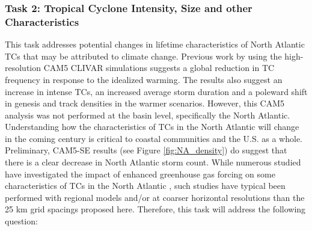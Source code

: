 \documentclass[11pt]{article}
\begin{document}





\subsubsection{Task 2: Tropical Cyclone Intensity, Size and other Characteristics}

This task addresses potential changes in lifetime characteristics of North Atlantic TCs that may be attributed to climate change. Previous work by \citet{Wehner2015} using the high-resolution CAM5 CLIVAR simulations suggests a global reduction in TC frequency in response to the idealized warming. The results also suggest an increase in intense TCs, an increased average storm duration and a poleward shift in genesis and track densities in the warmer scenarios. However, this CAM5 analysis was not performed at the basin level, specifically the North Atlantic. Understanding how the characteristics of TCs in the North Atlantic will change in the coming century is critical to coastal communities and the U.S. as a whole. Preliminary, CAM5-SE results (see Figure \ref{fig:NA_density}) do suggest that there is a clear decrease in North Atlantic storm count. While numerous studied have investigated the impact of enhanced greenhouse gas forcing on some characteristics of TCs in the North Atlantic \citep[e.g.,][]{Semmler2008,Knutson2008,Zhao2009,Knutson2013,Done2013,Diro2014}, such studies have typical been performed with regional models and/or at coarser horizontal resolutions than the 25 km grid spacings proposed here.  Therefore, this task will address the following question:
\end{document}

